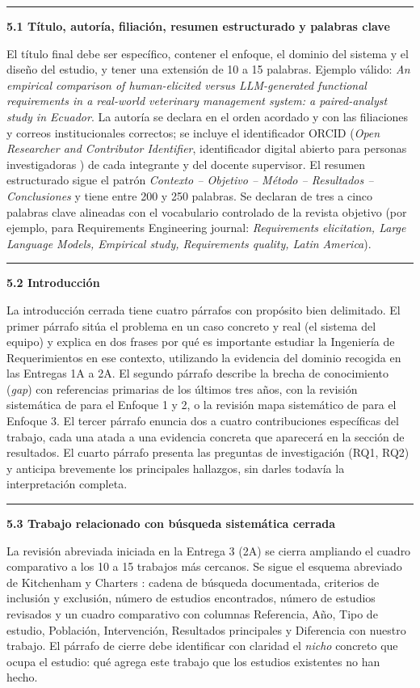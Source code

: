 \documentclass[11pt,a4paper]{article}
\newcounter{secc}
\newcommand{\submark}[1]{\par\vspace{4pt}\noindent
    {\color{uteqgreen}\rule[-1pt]{3.5pt}{12pt}}\hspace{6pt}\textbf{\color{uteqgreen}#1}\par\vspace{2pt}}
\begin{document}
\submark{5.1 Título, autoría, filiación, resumen estructurado y palabras clave}
El título final debe ser específico, contener el enfoque, el dominio del sistema y el diseño del estudio, y tener una extensión de 10 a 15 palabras.
Ejemplo válido: \emph{An empirical comparison of human-elicited versus LLM-generated functional requirements in a real-world veterinary management system: a paired-analyst study in Ecuador}.
La autoría se declara en el orden acordado y con las filiaciones y correos institucionales correctos; se incluye el identificador ORCID (\emph{Open Researcher and Contributor Identifier}, identificador digital abierto para personas investigadoras \cite{orcid_wiki}) de cada integrante y del docente supervisor.
El resumen estructurado sigue el patrón \emph{Contexto -- Objetivo -- Método -- Resultados -- Conclusiones} y tiene entre 200 y 250 palabras.
Se declaran de tres a cinco palabras clave alineadas con el vocabulario controlado de la revista objetivo (por ejemplo, para Requirements Engineering journal: \emph{Requirements elicitation, Large Language Models, Empirical study, Requirements quality, Latin America}).

\submark{5.2 Introducción}
La introducción cerrada tiene cuatro párrafos con propósito bien delimitado.
El primer párrafo sitúa el problema en un caso concreto y real (el sistema del equipo) y explica en dos frases por qué es importante estudiar la Ingeniería de Requerimientos en ese contexto, utilizando la evidencia del dominio recogida en las Entregas 1A a 2A.
El segundo párrafo describe la brecha de conocimiento (\emph{gap}) con referencias primarias de los últimos tres años, con la revisión sistemática de \cite{cheng2026genai} para el Enfoque 1 y 2, o la revisión mapa sistemático de \cite{chazette2022explainable} para el Enfoque 3.
El tercer párrafo enuncia dos a cuatro contribuciones específicas del trabajo, cada una atada a una evidencia concreta que aparecerá en la sección de resultados.
El cuarto párrafo presenta las preguntas de investigación (RQ1, RQ2) y anticipa brevemente los principales hallazgos, sin darles todavía la interpretación completa.

\submark{5.3 Trabajo relacionado con búsqueda sistemática cerrada}
La revisión abreviada iniciada en la Entrega 3 (2A) se cierra ampliando el cuadro comparativo a los 10 a 15 trabajos más cercanos.
Se sigue el esquema abreviado de Kitchenham y Charters \cite{kitchenham2007guidelines}: cadena de búsqueda documentada, criterios de inclusión y exclusión, número de estudios encontrados, número de estudios revisados y un cuadro comparativo con columnas Referencia, Año, Tipo de estudio, Población, Intervención, Resultados principales y Diferencia con nuestro trabajo.
El párrafo de cierre debe identificar con claridad el \emph{nicho} concreto que ocupa el estudio: qué agrega este trabajo que los estudios existentes no han hecho.
\end{document}
